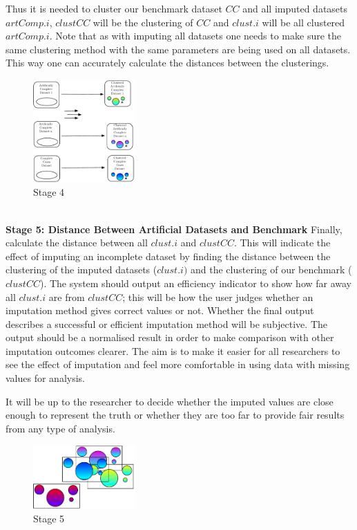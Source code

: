 \documentclass[conference,compsoc]{IEEEtran}
\begin{document}
		Thus it is needed to cluster our benchmark dataset $CC$ and all imputed datasets $artComp.i$, $clustCC$ will be the clustering of $CC$ and $clust.i$ will be all clustered $artComp.i$. Note that as with imputing all datasets one needs to make sure the same clustering method with the same parameters are being used on all datasets. This way one can accurately calculate the distances between the clusterings.
		\begin{figure}[!ht]
			\caption{Stage 4}
			\centering
			\includegraphics[width=0.35\textwidth]{stage4-2.pdf}
		\end{figure}
		\\
		\indent \textbf{Stage 5: Distance Between Artificial Datasets and Benchmark}
		Finally, calculate the distance between all $clust.i$ and $clustCC$. This will indicate the effect of imputing an incomplete dataset by finding the distance between the clustering of the imputed datasets ($clust.i)$ and the clustering of our benchmark ($clustCC$). The system should output an efficiency indicator to show how far away all $clust.i$ are from $clustCC$; this will be how the user judges whether an imputation method gives correct values or not. Whether the final output describes a successful or efficient imputation method will be subjective. The output should be a normalised result in order to make comparison with other imputation outcomes clearer. The aim is to make it easier for all researchers to see the effect of imputation and feel more comfortable in using data with missing values for analysis.

		It will be up to the researcher to decide whether the imputed values are close enough to represent the truth or whether they are too far to provide fair results from any type of analysis.
		\begin{figure}[!ht]
			\centering
			\includegraphics[width=0.35\textwidth]{stage5-2.pdf}
			\caption{Stage 5}
			\label{fig:stage-5}
		\end{figure}
\end{document}
